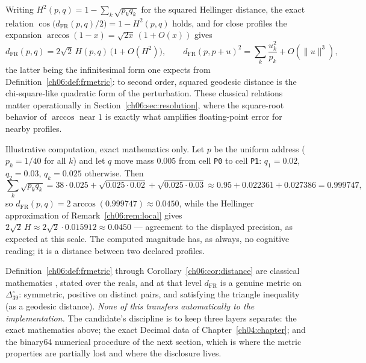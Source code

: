 \begin{remark}
\label{ch06:rem:local}
Writing $H^2(p, q) = 1 - \sum_k \sqrt{p_k q_k}$ for the squared
Hellinger distance, the exact relation
$\cos\bigl(d_{\mathrm{FR}}(p,q)/2\bigr) = 1 - H^2(p,q)$ holds, and for
close profiles the expansion $\arccos(1 - x) = \sqrt{2x}\,(1 + O(x))$
gives
\[
d_{\mathrm{FR}}(p, q) = 2\sqrt{2}\, H(p, q)\,\bigl(1 + O(H^2)\bigr),
\qquad
d_{\mathrm{FR}}(p, p + u)^2
 = \sum_k \frac{u_k^2}{p_k} + O(\lVert u \rVert^3),
\]
the latter being the infinitesimal form one expects from
Definition~\ref{ch06:def:frmetric}: to second order, squared geodesic
distance is the chi-square-like quadratic form of the perturbation.
These classical relations \cite{amari,ay} matter operationally in
Section~\ref{ch06:sec:resolution}, where the square-root behavior of
$\arccos$ near $1$ is exactly what amplifies floating-point error for
nearby profiles.
\end{remark}

\begin{example}\label{ch06:ex:worked}
Illustrative computation, exact mathematics only. Let $p$ be the
uniform address ($p_k = 1/40$ for all $k$) and let $q$ move mass
$0.005$ from cell \texttt{P0} to cell \texttt{P1}:
$q_1 = 0.02$, $q_2 = 0.03$, $q_k = 0.025$ otherwise. Then
\[
\sum_k \sqrt{p_k q_k}
 = 38 \cdot 0.025 + \sqrt{0.025 \cdot 0.02} + \sqrt{0.025 \cdot 0.03}
 \approx 0.95 + 0.022361 + 0.027386 = 0.999747,
\]
so $d_{\mathrm{FR}}(p, q) = 2 \arccos(0.999747) \approx 0.0450$, while
the Hellinger approximation of Remark~\ref{ch06:rem:local} gives
$2\sqrt{2}\, H \approx 2\sqrt{2} \cdot 0.015912 \approx 0.0450$ ---
agreement to the displayed precision, as expected at this scale. The
computed magnitude has, as always, no cognitive reading; it is a
distance between two declared profiles.
\end{example}

\begin{remark}\label{ch06:rem:exact}
Definition~\ref{ch06:def:frmetric} through
Corollary~\ref{ch06:cor:distance} are classical mathematics
\cite{rao,amari,ay}, stated over the reals, and at that level
$d_{\mathrm{FR}}$ is a genuine metric on $\Delta_{39}^{\circ}$:
symmetric, positive on distinct pairs, and satisfying the triangle
inequality (as a geodesic distance). \emph{None of this transfers
automatically to the implementation.} The candidate's discipline is to
keep three layers separate: the exact mathematics above; the exact
Decimal data of Chapter~\ref{ch04:chapter}; and the binary64 numerical
procedure of the next section, which is where the metric properties are
partially lost and where the disclosure lives.
\end{remark}

